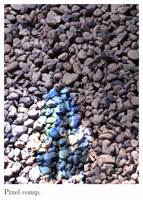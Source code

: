 \begin{figure}[]
\begin{subfigure}{\textwidth}
\begin{subfigure}{0.24\textwidth}
            \includegraphics[width=\textwidth]{images/04-experiment02/human/pebbles/pixel_im.jpg}
            \caption*{Pixel comp.}
        \end{subfigure}
        \hfill
        \begin{subfigure}{0.24\textwidth}
            \centering

\end{subfigure}
\end{subfigure}
\end{figure}
